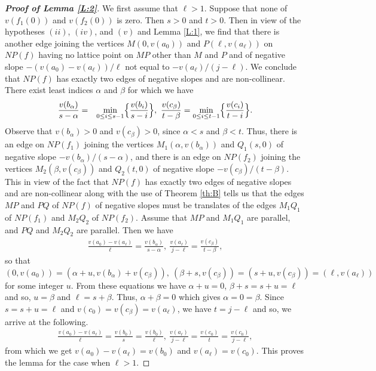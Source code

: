 \documentclass[12pt]{amsart}%
\begin{document}
\begin{proof}[\bf Proof of Lemma \ref{L:2}]
We first assume that $\ell>1$. Suppose that none of  $v(f_1(0))$ and $v(f_2(0))$ is zero. Then $s>0$ and $t>0$. Then in view of the hypotheses $(ii)$, $(iv)$, and $(v)$ and Lemma \ref{L:1}, we find that there is another edge joining the vertices $M(0,v(a_0))$ and $P(\ell,v(a_\ell))$ on $NP(f)$ having no lattice point on $MP$ other than $M$ and $P$ and of negative slope $-(v(a_0)-v(a_\ell))/\ell$ not equal to $-v(a_\ell)/(j-\ell)$. We conclude that $NP(f)$ has  exactly two edges of negative slopes and are non-collinear. There exist least indices  $\alpha$ and $\beta$ for which we have
\begin{eqnarray*}
 \frac{v(b_\alpha)}{s-\alpha}&=&\min_{0\leq i\leq s-1}\Bigl\{\frac{v(b_i)}{s-i}\Bigr\},~
 \frac{v(c_\beta)}{t-\beta}=\min_{0\leq i\leq t-1}\Bigl\{\frac{v(c_i)}{t-i}\Bigr\}.
 \end{eqnarray*}
Observe that $v(b_\alpha)>0$ and $v(c_\beta)>0$, since $\alpha<s$ and $\beta<t$.
Thus, there is an edge on  $NP(f_1)$  joining the vertices $M_1(\alpha,v(b_\alpha))$ and $Q_1(s,0)$ of negative slope $-v(b_\alpha)/(s-\alpha)$, and there is an edge on $NP(f_2)$ joining the vertices $M_2(\beta,v(c_\beta))$ and $Q_2(t,0)$ of negative slope $-v(c_\beta)/(t-\beta)$. This in view of the fact that $NP(f)$ has exactly two edges of negative slopes and are non-collinear along with  the use of Theorem \ref{th:B} tells us that the edges $MP$ and $PQ$ of $NP(f)$ of negative slopes must be translates of the edges $M_1Q_1$ of $NP(f_1)$ and $M_2Q_2$ of $NP(f_2)$. Assume that $MP$ and $M_1Q_1$ are parallel, and $PQ$ and $M_2Q_2$ are parallel. Then we have
\begin{eqnarray*}
 \frac{v(a_0)-v(a_\ell)}{\ell}=\frac{v(b_\alpha)}{s-\alpha},~\frac{v(a_\ell)}{j-\ell}=\frac{v(c_\beta)}{t-\beta},
 \end{eqnarray*}
so that $(0,v(a_0))=(\alpha+u,v(b_\alpha)+v(c_\beta)),~(\beta+s,v(c_\beta))=(s+u,v(c_\beta))=(\ell,v(a_\ell))$ for some integer $u$. From these equations we have $\alpha+u=0$, $\beta+s=s+u=\ell$ and so, $u=\beta$ and $\ell=s+\beta$. Thus, $\alpha+\beta=0$ which gives $\alpha=0=\beta$.  Since $s=s+u=\ell$  and $v(c_0)=v(c_\beta)=v(a_\ell)$, we have $t=j-\ell$ and so, we arrive at the following.
\begin{eqnarray*}
 \frac{v(a_0)-v(a_\ell)}{\ell}=\frac{v(b_0)}{s}=\frac{v(b_0)}{\ell},~\frac{v(a_\ell)}{j-\ell}=\frac{v(c_0)}{t}=
\frac{v(c_0)}{j-\ell},
\end{eqnarray*}
from which we get  $v(a_0)-v(a_\ell)=v(b_0)$ and $v(a_\ell)=v(c_0)$. This proves the lemma for the case when $\ell>1$.


\end{proof}
\end{document}
